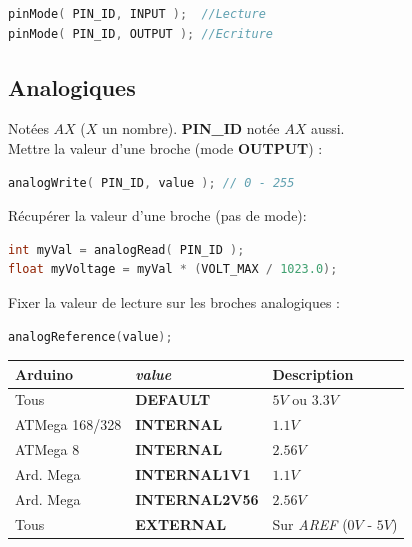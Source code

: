         \begin{lstlisting}[language=C]
pinMode( PIN_ID, INPUT );  //Lecture
pinMode( PIN_ID, OUTPUT ); //Ecriture
        \end{lstlisting}

        \subsection{Analogiques}
            \bmar
                Notées $AX$ ($X$ un nombre). \textbf{PIN\_ID} notée $AX$ aussi.\\
                Mettre la valeur d'une broche (mode \textbf{OUTPUT}) :
            \emar

            \begin{lstlisting}[language=C]
analogWrite( PIN_ID, value ); // 0 - 255
            \end{lstlisting}
            \vspace{0.5cm}
            \bmar
                Récupérer la valeur d'une broche (pas de mode):
            \emar

            \begin{lstlisting}[language=C]
int myVal = analogRead( PIN_ID );
float myVoltage = myVal * (VOLT_MAX / 1023.0);
            \end{lstlisting}

            \bmar
                Fixer la valeur de lecture sur les broches analogiques :
            \emar

            \begin{lstlisting}[language=C]
analogReference(value);
            \end{lstlisting}
            \begin{center}
                \begin{tabular}{| l | l | l |}
                    \hline
                        Arduino & \textit{value} & Description \\
                    \hline
                        Tous & \textbf{DEFAULT} & $5V$ ou $3.3V$ \\
                        ATMega 168/328 & \textbf{INTERNAL} & $1.1V$ \\
                        ATMega 8 & \textbf{INTERNAL} & $2.56V$ \\
                        Ard. Mega & \textbf{INTERNAL1V1} & $1.1V$ \\
                        Ard. Mega & \textbf{INTERNAL2V56} & $2.56V$ \\
                        Tous & \textbf{EXTERNAL} & Sur \textit{AREF} ($0V$ - $5V$) \\
                    \hline
                \end{tabular}
            \end{center}

